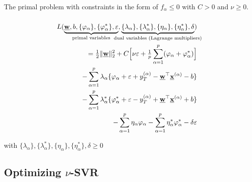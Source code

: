\begin{frame}
{\begin{block}{The primal problem with constraints in the form of $f_\alpha \le 0$}
        with $C>0$ and $\nu \ge 0$.
\end{block}
}

\end{frame}

\begin{frame}\frametitle{\subsecname}

\slidesonly{\vspace{-5mm}}

\begin{equation}
\left.\begin{aligned}
				L(\underbrace{\vec{w},b,\{\varphi_{\alpha}\},\{\varphi_{\alpha}^*\},\varepsilon}_{\text{primal variables}},
				\underbrace{\{\lambda_{\alpha}\}, \{\lambda_{\alpha}^*\},\{\eta_{\alpha}\},\{\eta_{\alpha}^*\},\delta}_{\mathclap{\text{dual variables (Lagrange multipliers)}}})\\
				= \smallfrac{1}{2} \lVert\vec{w}\rVert^2_2+C \Big\lbrack \nu \varepsilon 
					+ \smallfrac{1}{p} \sum_{\alpha=1}^p(\varphi_{\alpha}
					+\varphi_{\alpha}^*) \Big\rbrack \\
				-\sum_{\alpha=1}^p \lambda_{\alpha} \{\varphi_{\alpha}
				+\varepsilon+y_T^{(\alpha)}
				-\vec{w}^\top\vec{x}^{(\alpha)}-b \}  \\
				-\sum_{\alpha=1}^p \lambda_{\alpha}^* \{\varphi_{\alpha}^* 
				+\varepsilon-y_T^{(\alpha)}+\vec{w}^\top\vec{x}^{(\alpha)}+b \} \\ 
				-\sum_{\alpha=1}^p \eta_{\alpha} \varphi_{\alpha} 
				- \sum_{\alpha=1}^p \eta_{\alpha}^* \varphi_{\alpha}^* 
				- \delta \varepsilon
			\end{aligned}\right.
\end{equation}

with $\{\lambda_{\alpha}\}, \{\lambda_{\alpha}^*\},\{\eta_{\alpha}\},\{\eta_{\alpha}^*\},\delta \ge 0$

\end{frame}

\subsection{Optimizing $\nu$-SVR}

